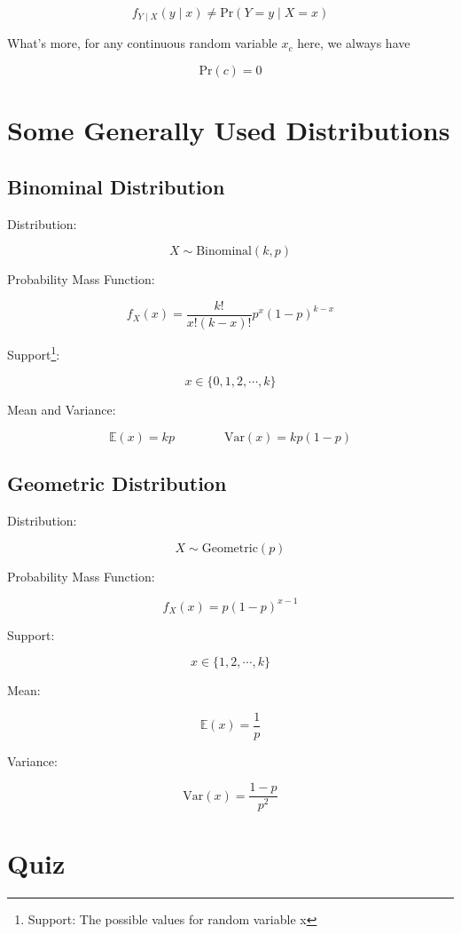 \documentclass[12pt]{article}
\begin{document}
\begin{flushleft}
$$f_{Y\mid X}(y\mid x) \neq \text{Pr}(Y = y \mid X = x)$$

\qquad What's more, for any continuous random variable $x_c$ here, we always have

$$\text{Pr}(c) = 0$$

\section{Some Generally Used Distributions}

\subsection*{Binominal Distribution} 

\qquad Distribution: 

$$X \sim \text{Binominal}(k,p)$$

\qquad Probability Mass Function: 

$$f_{X}(x) = \frac{k!}{x!(k-x)!}p^x(1-p)^{k-x}$$ 

\qquad Support\footnote{Support: The possible values for random variable x}: 

$$x \in \{0, 1, 2, \cdots, k \}$$

\qquad Mean and Variance: 

$$\mathbb{E}(x) = kp\qquad \qquad \text{Var}(x) = kp(1-p)$$

\subsection*{Geometric Distribution} 

\qquad Distribution: 

$$X \sim \text{Geometric}(p)$$

\qquad Probability Mass Function: 

$$f_{X}(x) = p(1-p)^{x-1}$$ 

\qquad Support: 

$$x \in \{1, 2, \cdots, k \}$$

\qquad Mean: 

$$\mathbb{E}(x) = \frac{1}{p}$$

\qquad Variance: 

$$\text{Var}(x) = \frac{1-p}{p^2}$$


\section{Quiz}


\end{flushleft}
\end{document}

